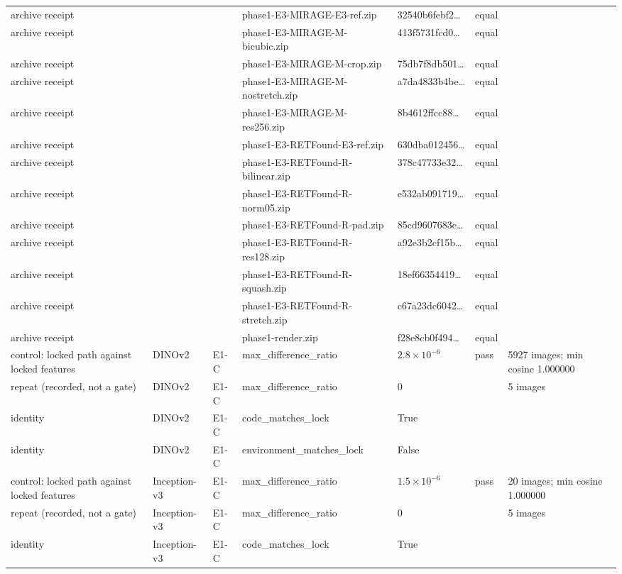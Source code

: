 \begin{longtable}{@{}p{3.3cm}lp{1.5cm}p{3.6cm}p{2.2cm}p{1.6cm}p{3.2cm}@{}}
archive receipt &  &  & phase1-E3-MIRAGE-E3-ref.zip & 32540b6febf2\ldots{} & equal &  \\
archive receipt &  &  & phase1-E3-MIRAGE-M-bicubic.zip & 413f5731fcd0\ldots{} & equal &  \\
archive receipt &  &  & phase1-E3-MIRAGE-M-crop.zip & 75db7f8db501\ldots{} & equal &  \\
archive receipt &  &  & phase1-E3-MIRAGE-M-nostretch.zip & a7da4833b4be\ldots{} & equal &  \\
archive receipt &  &  & phase1-E3-MIRAGE-M-res256.zip & 8b4612ffcc88\ldots{} & equal &  \\
archive receipt &  &  & phase1-E3-RETFound-E3-ref.zip & 630dba012456\ldots{} & equal &  \\
archive receipt &  &  & phase1-E3-RETFound-R-bilinear.zip & 378c47733e32\ldots{} & equal &  \\
archive receipt &  &  & phase1-E3-RETFound-R-norm05.zip & e532ab091719\ldots{} & equal &  \\
archive receipt &  &  & phase1-E3-RETFound-R-pad.zip & 85cd9607683e\ldots{} & equal &  \\
archive receipt &  &  & phase1-E3-RETFound-R-res128.zip & a92e3b2cf15b\ldots{} & equal &  \\
archive receipt &  &  & phase1-E3-RETFound-R-squash.zip & 18ef66354419\ldots{} & equal &  \\
archive receipt &  &  & phase1-E3-RETFound-R-stretch.zip & c67a23dc6042\ldots{} & equal &  \\
archive receipt &  &  & phase1-render.zip & f28e8cb0f494\ldots{} & equal &  \\
control: locked path against locked features & DINOv2 & E1-C & max\_difference\_ratio & $2.8\times10^{-6}$ & pass & 5927 images; min cosine 1.000000 \\
repeat (recorded, not a gate) & DINOv2 & E1-C & max\_difference\_ratio & 0 &  & 5 images \\
identity & DINOv2 & E1-C & code\_matches\_lock & True &  &  \\
identity & DINOv2 & E1-C & environment\_matches\_lock & False &  &  \\
control: locked path against locked features & Inception-v3 & E1-C & max\_difference\_ratio & $1.5\times10^{-6}$ & pass & 20 images; min cosine 1.000000 \\
repeat (recorded, not a gate) & Inception-v3 & E1-C & max\_difference\_ratio & 0 &  & 5 images \\
identity & Inception-v3 & E1-C & code\_matches\_lock & True &  &  \\

\end{longtable}
